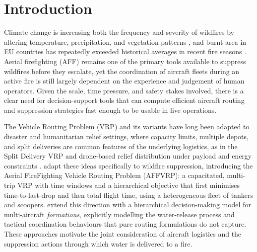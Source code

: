 

\chapter{Introduction}
\label{ch:introduction}

Climate change is increasing both the frequency and severity of wildfires by altering temperature, precipitation, and vegetation patterns \cite{dennison2009climate}, and burnt area in EU countries has repeatedly exceeded historical averages in recent fire seasons \cite{effis2024}. Aerial firefighting (AFF) remains one of the primary tools available to suppress wildfires before they escalate, yet the coordination of aircraft fleets during an active fire is still largely dependent on the experience and judgement of human operators. Given the scale, time pressure, and safety stakes involved, there is a clear need for decision-support tools that can compute efficient aircraft routing and suppression strategies fast enough to be usable in live operations.

The Vehicle Routing Problem (VRP) and its variants have long been adapted to disaster and humanitarian relief settings, where capacity limits, multiple depots, and split deliveries are common features of the underlying logistics, as in the Split Delivery VRP \cite{dror1989split} and drone-based relief distribution under payload and energy constraints \cite{rabta2018drone}. \citet{chalabi2024affvrp} adapt these ideas specifically to wildfire suppression, introducing the Aerial FireFighting Vehicle Routing Problem (AFFVRP): a capacitated, multi-trip VRP with time windows and a hierarchical objective that first minimises time-to-last-drop and then total flight time, using a heterogeneous fleet of tankers and scoopers. \citet{liu2025hierarchical} extend this direction with a hierarchical decision-making model for multi-aircraft \emph{formations}, explicitly modelling the water-release process and tactical coordination behaviours that pure routing formulations do not capture. These approaches motivate the joint consideration of aircraft logistics and the suppression actions through which water is delivered to a fire.

